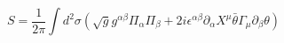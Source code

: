 \begin{equation}
S=\frac{1}{2\pi}\int d^2\sigma \left ( \sqrt{g}g^{\alpha\beta}\Pi_{\alpha}\Pi_{\beta}
+2i\epsilon^{\alpha\beta}\partial_{\alpha}X^{\mu}\bar{\theta}\Gamma_{\mu}
\partial_{\beta}\theta\right )\label{l}
\end{equation}

